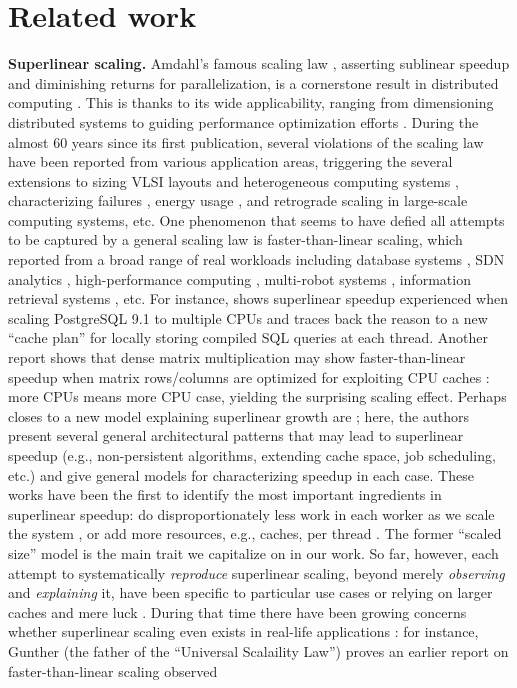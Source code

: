 \section{Related work}
\label{sec:related-work}

\noindent%
\textbf{Superlinear scaling.} %
Amdahl's famous scaling law \cite{10.1145/1465482.1465560}, asserting sublinear speedup and diminishing returns for parallelization, is a cornerstone result in distributed computing \cite{10.1145/42411.42415, 10.5555/775339.775386}. This is thanks to its wide applicability, ranging from dimensioning distributed systems \cite{1580395} to guiding performance optimization efforts \cite{10.5555/1951599, 10.1145/42411.42415}. During the almost 60 years since its first publication, several violations of the scaling law have been reported from various application areas, triggering the several extensions to sizing VLSI layouts \cite{4563876} and heterogeneous computing systems \cite{6280307}, characterizing failures \cite{406581}, energy usage \cite{6163449}, and retrograde scaling \cite{10.5555/1951599} in large-scale computing systems, etc. One phenomenon that seems to have defied all attempts to be captured by a general scaling law is faster-than-linear scaling, which reported from a broad range of real workloads including database systems \cite{scalability-analyzed, 10.5555/1012889.1012894}, SDN analytics \cite{sdn-analytitcs}, high-performance computing \cite{556383, 7733347, 6483679}, multi-robot systems \cite{10.1007/978-3-319-77610-1}, information retrieval systems \cite{dobb-1, dobb-2}, etc. For instance, \cite{scalability-analyzed} shows superlinear speedup experienced when scaling PostgreSQL 9.1 to multiple CPUs and traces back the reason to a new ``cache plan'' for locally storing compiled SQL queries at each thread. Another report shows that dense matrix multiplication may show faster-than-linear speedup when matrix rows\slash columns are optimized for exploiting CPU caches \cite{7733347}: more CPUs means more CPU case, yielding the surprising scaling effect. Perhaps closes to a new model explaining superlinear growth are \cite{7733347, 80148}; here, the authors present several general architectural patterns that may lead to superlinear speedup (e.g., non-persistent algorithms, extending cache space, job scheduling, etc.) and give general models for characterizing speedup in each case. These works have been the first to identify the most important ingredients in superlinear speedup: do disproportionately less work in each worker as we scale the system \cite{7733347}, or add more resources, e.g., caches, per thread \cite{80148}. The former ``scaled size'' model \cite{556383} is the main trait we capitalize on in our work.  So far, however, each attempt to systematically \emph{reproduce} superlinear scaling, beyond merely \emph{observing} and \emph{explaining} it, have been specific to particular use cases \cite{556383} or relying on larger caches and mere luck \cite{556383}. During that time there have been growing concerns whether superlinear scaling even exists in real-life applications \cite{10.1016/0167-8191(86)90024-4}: for instance, Gunther (the father of the ``Universal Scalaility Law'') proves an earlier report on faster-than-linear scaling observed 